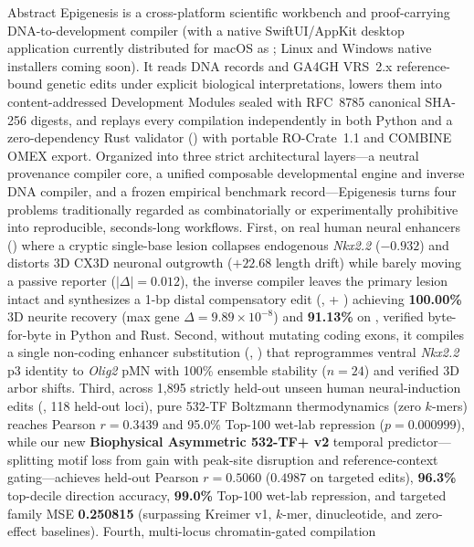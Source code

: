 \documentclass[10.5pt,a4paper]{article}
\begin{document}

\begin{abstractbox}{Abstract}
Epigenesis is a cross-platform scientific workbench and proof-carrying DNA-to-development compiler (with a native SwiftUI/AppKit desktop application currently distributed for macOS as ; Linux and Windows native installers coming soon\texttrademark). It reads DNA records and GA4GH VRS~2.x reference-bound genetic edits under explicit biological interpretations, lowers them into content-addressed Development Modules sealed with RFC~8785 canonical SHA-256 digests, and replays every compilation independently in both Python and a zero-dependency Rust validator () with portable RO-Crate~1.1 and COMBINE OMEX export. Organized into three strict architectural layers—a neutral provenance compiler core, a unified composable developmental engine and inverse DNA compiler, and a frozen empirical benchmark record—Epigenesis turns four problems traditionally regarded as combinatorially or experimentally prohibitive into reproducible, seconds-long workflows. First, on real human neural enhancers () where a cryptic single-base lesion collapses endogenous \emph{Nkx2.2} ($-0.932$) and distorts 3D CX3D neuronal outgrowth ($+22.68$ length drift) while barely moving a passive reporter ($|\Delta|=0.012$), the inverse compiler leaves the primary lesion intact and synthesizes a 1-bp distal compensatory edit (,  + ) achieving \textbf{100.00\%} 3D neurite recovery (max gene $\Delta = 9.89\times10^{-8}$) and \textbf{91.13\%} on , verified byte-for-byte in Python and Rust. Second, without mutating coding exons, it compiles a single non-coding enhancer substitution (, ) that reprogrammes ventral \emph{Nkx2.2} p3 identity to \emph{Olig2} pMN with 100\% ensemble stability ($n=24$) and verified 3D arbor shifts. Third, across 1,895 strictly held-out unseen human neural-induction edits (, 118 held-out loci), pure 532-TF Boltzmann thermodynamics (zero $k$-mers) reaches Pearson $r=0.3439$ and 95.0\% Top-100 wet-lab repression ($p=0.000999$), while our new \textbf{Biophysical Asymmetric 532-TF+ v2} temporal predictor—splitting motif loss from gain with peak-site disruption and reference-context gating—achieves held-out Pearson \textbf{$r=0.5060$} ($0.4987$ on targeted edits), \textbf{96.3\%} top-decile direction accuracy, \textbf{99.0\%} Top-100 wet-lab repression, and targeted family MSE \textbf{0.250815} (surpassing Kreimer v1, $k$-mer, dinucleotide, and zero-effect baselines). Fourth, multi-locus chromatin-gated compilation 
\end{abstractbox}
\end{document}
